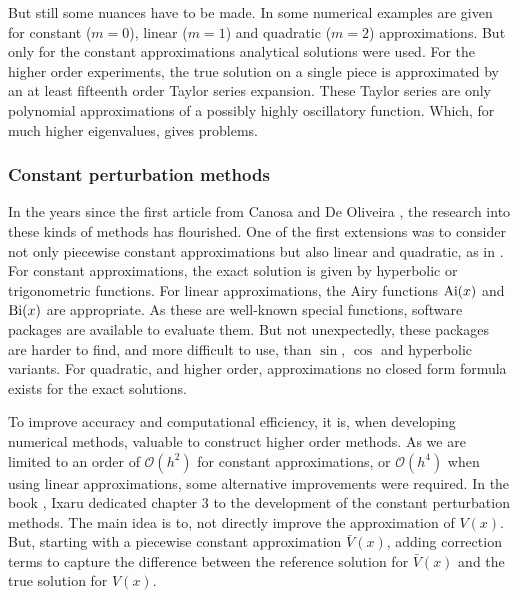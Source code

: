 But still some nuances have to be made. In \cite{pruess_estimating_1973} some numerical examples are given for constant ($m=0$), linear ($m=1$) and quadratic ($m=2$) approximations. But only for the constant approximations analytical solutions were used. For the higher order experiments, the true solution on a single piece is approximated by an at least fifteenth order Taylor series expansion. These Taylor series are only polynomial approximations of a possibly highly oscillatory function. Which, for much higher eigenvalues, gives problems.

\subsubsection{Constant perturbation methods}

In the years since the first article from Canosa and De Oliveira \cite{canosa_new_1970}, the research into these kinds of methods has flourished. One of the first extensions was to consider not only piecewise constant approximations but also linear and quadratic, as in \cite{pruess_estimating_1973}. For constant approximations, the exact solution is given by hyperbolic or trigonometric functions. For linear approximations, the Airy functions $\operatorname{Ai}(x)$ and $\operatorname{Bi}(x)$ are appropriate. As these are well-known special functions, software packages are available to evaluate them. But not unexpectedly, these packages are harder to find, and more difficult to use, than $\sin$, $\cos$ and hyperbolic variants. For quadratic, and higher order, approximations no closed form formula exists for the exact solutions.

To improve accuracy and computational efficiency, it is, when developing numerical methods, valuable to construct higher order methods. As we are limited to an order of $\mathcal{O}(h^2)$ for constant approximations, or $\mathcal{O}(h^4)$ when using linear approximations, some alternative improvements were required. In the book \cite{ixaru_numerical_1984}, Ixaru dedicated chapter 3 to the development of the constant perturbation methods. The main idea is to, not directly improve the approximation of $V(x)$. But, starting with a piecewise constant approximation $\bar{V}(x)$, adding correction terms to capture the difference between the reference solution for $\bar{V}(x)$ and the true solution for $V(x)$.

